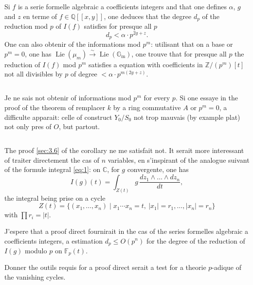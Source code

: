 \documentclass[12pt,a4paper]{article}
\theoremstyle{plain}
\theoremstyle{definition}
\theoremstyle{remark}
\DeclareMathOperator{\Lie}{Lie}
\newcommand{\CC}{\mathbb{C}}
\newcommand{\Gm}{\mathbb{G}_{\mathrm{m}}}
\newcommand{\FF}{\mathbb{F}}
\newcommand{\QQ}{\mathbb{Q}}
\providecommand{\CC}{\mathbb{C}}
\providecommand{\FF}{\mathbb{F}}
\providecommand{\QQ}{\mathbb{Q}}
\providecommand{\ZZ}{\mathbb{Z}}
\providecommand{\Gm}{\mathbb{G}_{\mathrm m}}
\providecommand{\Lie}{\operatorname{Lie}}
\begin{document}
Si $f$ is a serie formelle algebraic a coefficients integers and that one defines $\alpha$,
$g$ and $z$ en terme of $f\in\QQ[[x,y]]$, one deduces that the degree $d_p$ of the reduction
mod $p$ of $I(f)$ satisfies for presque all $p$
\begin{equation}\label{eq:3.7.2}
d_p<\alpha\cdot p^{2g+z}.
\end{equation}
One can also obtenir of the informations mod $p^m$: utilisant that on a base
or $p^m=0$, one has $\Lie(\mu_m)\xrightarrow{\sim}\Lie(\Gm)$, one trouve that for presque all $p$ the
reduction of $I(f)$ mod $p^m$ satisfies a equation with coefficients in $\ZZ/(p^m)[t]$ not
all divisibles by $p$ of degree $<\alpha\cdot p^{m(2g+z)}$.

\subsection{}

Je ne sais not obtenir of informations mod $p^m$ for every $p$. Si one essaye in
the proof of the theorem of remplacer $k$ by a ring commutative $A$ or $p^m=0$,
a difficulte apparait: celle of construct $Y_0/S_0$ not trop mauvais (by example
plat) not only pres of $O$, but partout.

\subsection{}

The proof \ref{sec:3.6} of the corollary ne me satisfait not. It serait more
interessant of traiter directement the cas of $n$ variables, en s'inspirant of
the analogue suivant of the formule integral \eqref{eq:1}: on $\CC$, for $g$ convergente, one has
\begin{equation}\label{eq:1prime}
I(g)(t)=\int_{Z(t)} g\,\frac{dz_1\wedge\dots\wedge dz_n}{dt},
\end{equation}
the integral being prise on a cycle
\[
Z(t)=\{(x_1,\dots,x_n)\mid x_1\dotsm x_n=t,\ |x_1|=r_1,\dots,|x_n|=r_n\}
\]
with $\prod r_i=|t|$.

J'espere that a proof direct fournirait in the cas of the series
formelles algebraic a coefficients integers, a estimation $d_p\le O(p^n)$ for the
degree of the reduction of $I(g)$ modulo $p$ on $\FF_p(t)$.

Donner the outils requis for a proof direct serait a test for
a theorie $p$-adique of the vanishing cycles.

\subsection{}
\end{document}
